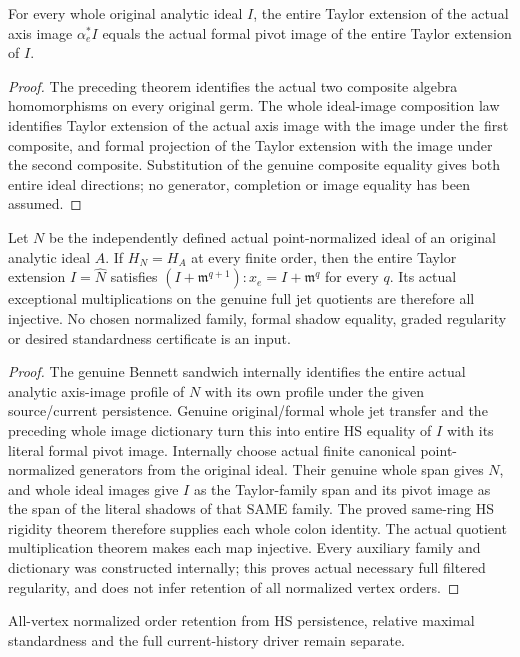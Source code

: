 \begin{theorem}
\label{hir:actual-whole-taylor-axis-ideal-image-dictionary}
\leanok
For every whole original analytic ideal $I$, the entire Taylor
extension of the actual axis image $\alpha_e^*I$ equals the actual
formal pivot image of the entire Taylor extension of $I$.
\end{theorem}
\begin{proof}
The preceding theorem identifies the actual two composite algebra
homomorphisms on every original germ. The whole ideal-image composition
law identifies Taylor extension of the actual axis image with the
image under the first composite, and formal projection of the Taylor
extension with the image under the second composite. Substitution of
the genuine composite equality gives both entire ideal directions;
no generator, completion or image equality has been assumed.
\end{proof}

\begin{theorem}
\label{hir:actual-original-point-persistent-hs-full-initial-colons}
\leanok
Let $N$ be the independently defined actual point-normalized ideal of
an original analytic ideal $A$. If $H_N=H_A$ at every finite order,
then the entire Taylor extension $I=\widehat N$ satisfies
$(I+\mathfrak m^{q+1}):x_e=I+\mathfrak m^q$ for every $q$.
Its actual exceptional multiplications on the genuine full jet
quotients are therefore all injective. No chosen normalized family,
formal shadow equality, graded regularity or desired standardness
certificate is an input.
\end{theorem}
\begin{proof}
The genuine Bennett sandwich internally identifies the entire actual
analytic axis-image profile of $N$ with its own profile under the
given source/current persistence. Genuine original/formal whole jet
transfer and the preceding whole image dictionary turn this into
entire HS equality of $I$ with its literal formal pivot image.
Internally choose actual finite canonical point-normalized generators
from the original ideal. Their genuine whole span gives $N$, and
whole ideal images give $I$ as the Taylor-family span and its pivot
image as the span of the literal shadows of that SAME family.
The proved same-ring HS rigidity theorem therefore supplies each
whole colon identity. The actual quotient multiplication theorem
makes each map injective. Every auxiliary family and dictionary was
constructed internally; this proves actual necessary full filtered
regularity, and does not infer retention of all normalized vertex orders.
\end{proof}

All-vertex normalized order retention from HS persistence, relative
maximal standardness and the full current-history driver remain separate.

